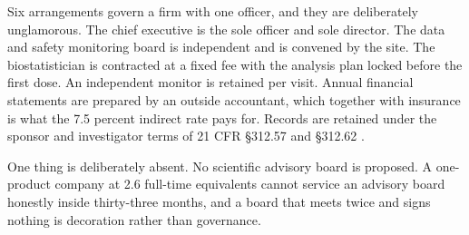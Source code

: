 Six arrangements govern a firm with one officer, and they are deliberately
unglamorous. The chief executive is the sole officer and sole director. The data
and safety monitoring board is independent and is convened by the site. The
biostatistician is contracted at a fixed fee with the analysis plan locked
before the first dose. An independent monitor is retained per visit. Annual
financial statements are prepared by an outside accountant, which together with
insurance is what the 7.5 percent indirect rate pays for. Records are retained
under the sponsor and investigator terms of 21 CFR \S312.57 and \S312.62
\cite{ecfr2026part312records}.

One thing is deliberately absent. No scientific advisory board is proposed. A
one-product company at 2.6 full-time equivalents cannot service an advisory
board honestly inside thirty-three months, and a board that meets twice and
signs nothing is decoration rather than governance.
